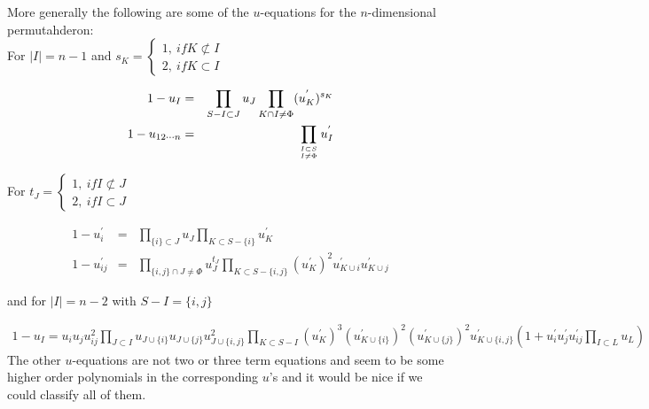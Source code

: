 \documentclass[hidelinks,12pt]{article}
\newcommand{\bea}[1]{\begin{eqnarray}\label{#1} }
\newcommand{\eea}{\end{eqnarray}}
\def\bea{\begin{eqnarray}}
\def\eea{\end{eqnarray}}
\begin{document}
More generally the following are some of the $u$-equations for the $n$-dimensional permutahderon:\\

For $|I| =n-1$ and $s_K = \begin{cases}  1,~ if K \not\subset I & \\ 2, ~if K \subset I\end{cases}$

\bea
1-u_{I} &=& \prod_ {S - I \subset J } u_{J} \prod_ {K \cap I \ne \Phi } (u^{'}_{K})^{s_K}  \nonumber \\
1-u_{12\cdots n} &=& \prod_ {{I \subset S}\atop {I \ne \Phi}} u^{'}_{I} \nonumber
\eea

For $t_J = \begin{cases}  1,~ if I  \not\subset J & \\ 2, ~if I \subset J \end{cases}$

\bea
1-u^{'}_{i} &=& \prod_ {\{ i \} \subset J } u_{J} \prod_ {K \subset S- \{i\} } u^{'}_{K} \nonumber \\
1-u^{'}_{i j} &=& \prod_ {\{i,j \}\cap J \ne \Phi} u^{t_J}_{J} \prod_ {K \subset S-\{i, j \} } (u^{'}_{K})^{2} u^{'}_{K \cup {i}} u^{'}_{K \cup{j} } \nonumber 
\eea

and for $|I| =n-2$ with $S- I = \{i, j\}$

\bea
1-u_{I}= u_i u_j u^{2}_{ij} \prod_{J \subset I} u_{J \cup \{i\}} u_{J \cup \{j\}} u^{2}_{J \cup \{i,j\}} \prod_{K \subset S-I} (u^{'}_K)^{3} (u^{'}_{K \cup \{i\}})^{2}  (u^{'}_{K \cup\{j\}})^{2}  u^{'}_{K\cup \{i,j\}} \left( 1+ u^{'}_i u^{'}_j u^{'}_{ij} \prod_{I \subset L} u_L \right)                       \nonumber
\eea
The other $u$-equations are not two or three term equations and seem to be some higher  order polynomials in the corresponding $u$'s and it would be nice if we could classify all of them.




\end{document}
